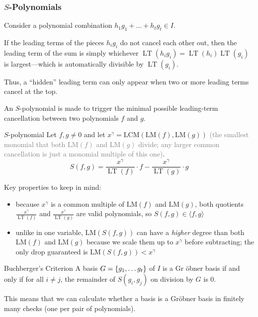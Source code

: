 \documentclass[a4paper, 11pt]{report}
\newcommand{\LT}{\operatorname{LT}}
\begin{document}
\subsubsection{$S$-Polynomials}
Consider a polynomial combination $h_1 g_1 + \dots + h_t g_t \in I$. 

If the leading terms of the pieces $h_i g_i$ do not cancel each other out, then the leading term of the sum is simply whichever $\LT(h_i g_i) = \LT(h_i)\LT(g_i)$ is largest—which is automatically divisible by $\LT(g_i)$.

Thus, a ``hidden'' leading term can only appear when two or more leading terms cancel at the top.

An $S$-polynomial is made to trigger the minimal possible leading-term cancellation between two polynomials $f$ and $g$.

\begin{defframe}{$S$-polynomial}{}
    Let $f, g \neq 0$ and let $x^{\gamma} = \text{LCM}(\text{LM}(f), \text{LM}(g))$ \textcolor{gray}{(the smallest monomial that both $\text{LM}(f)$ and $\text{LM}(g)$ divide; any larger common cancellation is just a monomial multiple of this one)}.
    $$ S(f,g) = \frac{x^{\gamma}}{\LT(f)} \cdot f - \frac{x^{\gamma}}{\LT(g)} \cdot g $$
\end{defframe}

\noindent Key properties to keep in mind:
\begin{itemize}
    \item  because $x^\gamma$ is a common multiple of $\text{LM}(f)$ and $\text{LM}(g)$, both quotients $\frac{x^\gamma}{\LT(f)}$ and $\frac{x^\gamma}{\LT(g)}$ are valid polynomials, so $S(f,g) \in \langle f, g \rangle$
    \item unlike in one variable, $\text{LM}(S(f,g))$ can have a \emph{higher} degree than both $\text{LM}(f)$ and $\text{LM}(g)$ because we scale them up to $x^\gamma$ before subtracting; the only drop guaranteed is $\text{LM}(S(f,g)) < x^\gamma$
\end{itemize}


\begin{thmframe}{Buchberger's Criterion}{}
    A basis $G = \set{g_1, \dots g_{t}}$ of $I$ is a Gr \"obner basis if and only if for all $i \neq j$, the remainder of $S(g_{i}, g_{j})$ on division by $G$ is $0$.
\end{thmframe}

This means that we can calculate whether a basis is a Gr\"obner basis in finitely many checks (one per pair of polynomials).
\end{document}
